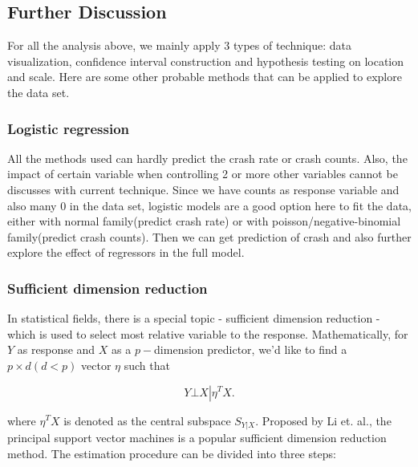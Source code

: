 \documentclass[11pt]{scrartcl} %
\begin{document}
\subsection{Further Discussion}

For all the analysis above, we mainly apply 3 types of technique: data visualization, confidence interval construction and hypothesis testing on location and scale. Here are some other probable methods that can be applied to explore the data set.

\subsubsection{Logistic regression}

All the methods used can hardly predict the crash rate or crash counts. Also, the impact of certain variable when controlling 2 or more other variables cannot be discusses with current technique. Since we have counts as response variable and also many 0 in the data set, logistic models are a good option here to fit the data, either with normal family(predict crash rate) or with poisson/negative-binomial family(predict crash counts). Then we can get prediction of crash and also further explore the effect of regressors in the full model.

\subsubsection{Sufficient dimension reduction}

In statistical fields, there is a special topic - sufficient dimension reduction - which is used to select most relative variable to the response. Mathematically, for $Y$ as response and $X$ as a $p-$dimension predictor, we'd like to find a $p \times d\left( {d < p} \right)$ vector $\eta $ such that

\begin{equation*}
Y \bot X\left| {{\eta ^T}X}. \right.
\end{equation*}

where ${\eta ^T}X$ is denoted as the central subspace ${S_{Y\left| X \right.}}$. Proposed by Li et. al.\cite{li2011principal}, the principal support vector machines is a popular sufficient dimension reduction method. The estimation procedure can be divided into three steps:
\end{document}
